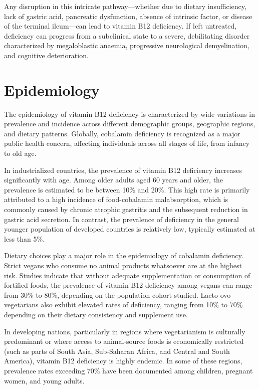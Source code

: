 Any disruption in this intricate pathway—whether due to dietary insufficiency, lack of gastric acid, pancreatic dysfunction, absence of intrinsic factor, or disease of the terminal ileum—can lead to vitamin B12 deficiency. If left untreated, deficiency can progress from a subclinical state to a severe, debilitating disorder characterized by megaloblastic anaemia, progressive neurological demyelination, and cognitive deterioration.

\section*{Epidemiology}
The epidemiology of vitamin B12 deficiency is characterized by wide variations in prevalence and incidence across different demographic groups, geographic regions, and dietary patterns. Globally, cobalamin deficiency is recognized as a major public health concern, affecting individuals across all stages of life, from infancy to old age.

In industrialized countries, the prevalence of vitamin B12 deficiency increases significantly with age. Among older adults aged 60 years and older, the prevalence is estimated to be between 10\% and 20\%. This high rate is primarily attributed to a high incidence of food-cobalamin malabsorption, which is commonly caused by chronic atrophic gastritis and the subsequent reduction in gastric acid secretion. In contrast, the prevalence of deficiency in the general younger population of developed countries is relatively low, typically estimated at less than 5\%.

Dietary choices play a major role in the epidemiology of cobalamin deficiency. Strict vegans who consume no animal products whatsoever are at the highest risk. Studies indicate that without adequate supplementation or consumption of fortified foods, the prevalence of vitamin B12 deficiency among vegans can range from 30\% to 80\%, depending on the population cohort studied. Lacto-ovo vegetarians also exhibit elevated rates of deficiency, ranging from 10\% to 70\% depending on their dietary consistency and supplement use.

In developing nations, particularly in regions where vegetarianism is culturally predominant or where access to animal-source foods is economically restricted (such as parts of South Asia, Sub-Saharan Africa, and Central and South America), vitamin B12 deficiency is highly endemic. In some of these regions, prevalence rates exceeding 70\% have been documented among children, pregnant women, and young adults.

